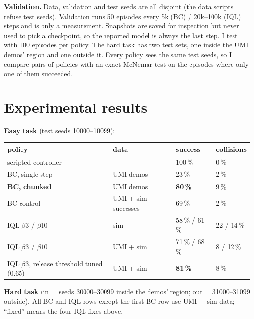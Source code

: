 \documentclass[10pt]{article}
\newcommand{\pct}{\,\%}
\newcommand{\para}[1]{\textbf{#1}}
\begin{document}
\para{Validation.} Data, validation and test seeds are all disjoint (the data scripts refuse test seeds).
Validation runs 50 episodes every 5k (BC) / 20k--100k (IQL) steps and is only a measurement. Snapshots are saved for
inspection but never used to pick a checkpoint, so the reported model is always the last step. I test with 100
episodes per policy. The hard task has two test sets, one inside the UMI demos' region and one outside it. Every policy sees the same test seeds, so I compare pairs of policies with an exact McNemar test on the episodes where only one of them succeeded.

\section{Experimental results}

\para{Easy task} (test seeds 10000--10099):

\begin{center}
\begin{tabular}{llll}
\toprule
policy & data & success  & collisions \\
\midrule
scripted controller & --- & 100\pct{} & 0\pct \\
BC, single-step & UMI demos & 23\pct{}  & 2\pct \\
\textbf{BC, chunked} & UMI demos & \textbf{80\pct{}} & 9\pct \\
BC control & UMI + sim successes & 69\pct{} & 2\pct \\
IQL $\beta 3$ / $\beta 10$ & sim & 58\pct{} / 61\pct & 22 / 14\pct \\
IQL $\beta 3$ / $\beta 10$ & UMI + sim & 71\pct{} / 68\pct & 8 / 12\pct \\
IQL $\beta 3$, release threshold tuned (0.65) & UMI + sim & \textbf{81\pct{}} & 8\pct \\
\bottomrule
\end{tabular}
\end{center}

\para{Hard task} (in = seeds 30000--30099 inside the demos' region; out = 31000--31099 outside). All BC and IQL rows except the first BC row use UMI + sim data; ``fixed'' means the four IQL fixes above.
\end{document}
